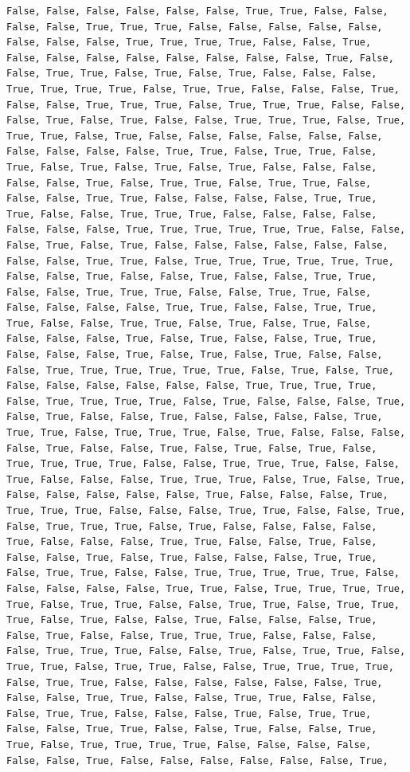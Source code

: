 \documentclass[
  letterpaper,
  DIV=11,
  numbers=noendperiod]{scrartcl}
\begin{document}
\begin{verbatim}
False, False, False, False, False, False, True, True, False, False, False, False, True, True, True, False, False, False, False, False, False, False, False, True, True, True, True, False, False, True, False, False, False, False, False, False, False, False, True, False, False, True, True, False, True, False, True, False, False, False, True, True, True, True, False, True, True, False, False, False, True, False, False, True, True, True, False, True, True, True, False, False, False, True, False, True, False, False, True, True, True, False, True, True, True, False, True, False, False, False, False, False, False, False, False, False, False, True, True, False, True, True, False, True, False, True, False, True, False, True, False, False, False, False, False, True, False, True, True, False, True, True, False, False, False, True, True, False, False, False, False, True, True, True, False, False, True, True, True, False, False, False, False, False, False, False, True, True, True, True, True, True, False, False, False, True, False, True, False, False, False, False, False, False, False, False, True, True, False, True, True, True, True, True, True, False, False, True, False, False, True, False, False, True, True, False, False, True, True, True, False, False, True, True, False, False, False, False, False, True, True, False, False, True, True, True, False, False, True, True, False, True, False, True, False, False, False, False, True, False, True, False, False, True, True, False, False, False, True, False, True, False, True, False, False, False, True, True, True, True, True, True, False, True, False, True, False, False, False, False, False, False, True, True, True, True, False, True, True, True, True, False, True, False, False, False, True, False, True, False, False, True, False, False, False, False, True, True, True, False, True, True, True, False, True, False, False, False, False, True, False, False, True, False, True, False, True, False, True, True, True, True, False, False, True, True, True, False, False, True, False, False, False, True, True, True, False, True, False, True, False, False, False, False, False, True, False, False, False, True, True, True, True, False, False, False, True, True, False, False, True, False, True, True, True, False, True, False, False, False, False, True, False, False, False, True, True, False, False, True, False, False, False, True, False, True, False, False, False, True, True, False, True, True, False, False, True, True, True, True, True, False, False, False, False, False, True, True, False, True, True, True, True, True, False, True, True, False, False, True, True, False, True, True, True, False, True, False, False, True, False, False, False, True, False, True, False, False, True, True, True, False, False, False, False, True, True, True, False, False, True, False, True, True, False, True, True, False, True, True, False, False, True, True, True, True, False, True, True, False, False, False, False, False, False, True, False, False, True, True, False, False, True, True, False, False, False, True, True, False, False, False, True, False, True, True, False, False, True, True, False, False, True, False, False, True, True, False, True, True, True, True, False, False, False, False, False, False, True, False, False, False, False, False, False, True, 
\end{verbatim}
\end{document}
